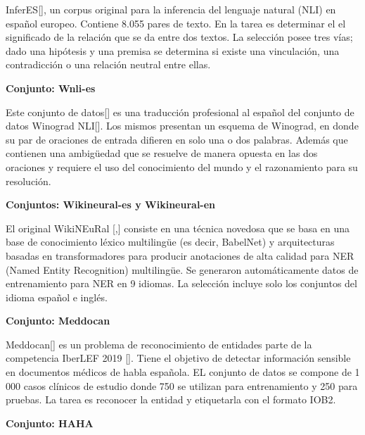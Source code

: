 \begin{annexes}
InferES[\cite{inferes}], un corpus original para la inferencia del lenguaje natural (NLI) en español europeo. Contiene 8.055 pares de texto. En la tarea es determinar el 
el significado de la relación que se da entre dos textos. La selección posee tres vías; dado una hipótesis y una premisa se determina si existe una vinculación, una contradicción o
una relación neutral entre ellas.

\begin{flushleft} 
    { \textbf{Conjunto: Wnli-es}}\label{description:wnli}
\end{flushleft}


Este conjunto de datos[\cite{wnli2}] es una traducción profesional al español del conjunto de datos Winograd NLI[\cite{wnli}]. Los mismos presentan un esquema de Winograd, en donde su 
par de oraciones de entrada difieren en solo una o dos palabras. Además que contienen una ambigüedad que se resuelve de manera opuesta en las dos oraciones y requiere 
el uso del conocimiento del mundo y el razonamiento para su resolución.

\begin{flushleft} 
    { \textbf{Conjuntos: Wikineural-es y Wikineural-en}}\label{description:wikineural}
\end{flushleft}

El original WikiNEuRal [\cite{wikineural},\cite{wikineural2}] consiste en una técnica novedosa que se basa en una base de conocimiento léxico multilingüe (es decir, BabelNet) y arquitecturas basadas en 
transformadores para producir anotaciones de alta calidad para NER (Named Entity Recognition) multilingüe. Se generaron automáticamente datos de entrenamiento para 
NER en 9 idiomas. La selección incluye solo los conjuntos del idioma español e inglés.

\begin{flushleft} 
    { \textbf{Conjunto: Meddocan}}\label{description:meddocan}
\end{flushleft}

Meddocan[\cite{meddocan}] es un problema de reconocimiento de entidades parte de la competencia IberLEF 2019 [\cite{sepln-2019iberlef}]. Tiene el objetivo de 
detectar información sensible en documentos médicos de habla española. 
EL conjunto de datos se compone de 1 000 casos clínicos de estudio donde 750 se utilizan para entrenamiento y 250 para pruebas. La tarea es reconocer la entidad y 
etiquetarla con el formato IOB2.

\begin{flushleft} 
    { \textbf{Conjunto: HAHA}}\label{description:haha}
\end{flushleft}


\end{annexes}
